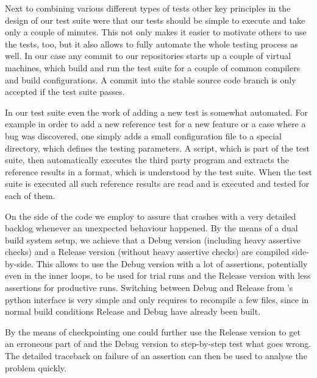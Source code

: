 Next to combining various different types of tests
other key principles in the design of our test suite were that our tests should be simple
to execute and take only a couple of minutes.
This not only makes it easier to motivate others to use the tests, too,
but it also allows to fully automate the whole testing process as well.
In our case any commit to our repositories starts up a couple of virtual machines,
which build \molsturm and run the test suite for a couple of common compilers and
build configurations.
A commit into the stable source code branch is only accepted if the test suite passes.

In our test suite even the work of adding a new test is somewhat automated.
For example in order to add a new reference test for a new feature
or a case where a bug was discovered,
one simply adds a small configuration file to a special directory,
which defines the testing parameters.
A \python script, which is part of the test suite,
then automatically executes the third party program and extracts the reference results in a format,
which is understood by the \molsturm test suite.
When the test suite is executed all such reference results are read and
\molsturm is executed and tested for each of them.


On the side of the \molsturm code we employ  to assure that
\molsturm crashes with a very detailed backlog whenever an unexpected behaviour happened.
By the means of a dual build system setup, we achieve that a Debug version
(including heavy assertive checks) and a Release version
(without heavy assertive checks) are compiled side-by-side.
This allows to use the Debug version with a lot of assertions,
potentially even in the inner loops,
to be used for trial runs and the Release version with less assertions for productive runs.
Switching between Debug and Release from \molsturm's python interface is very simple and
only requires to recompile a few files,
since in normal build conditions Release and Debug have already been built.

By the means of checkpointing one could further use the Release version to get an erroneous
part of \molsturm and the Debug version to step-by-step test what goes wrong.
The detailed traceback on failure of an assertion can then be used to analyse the problem quickly.
